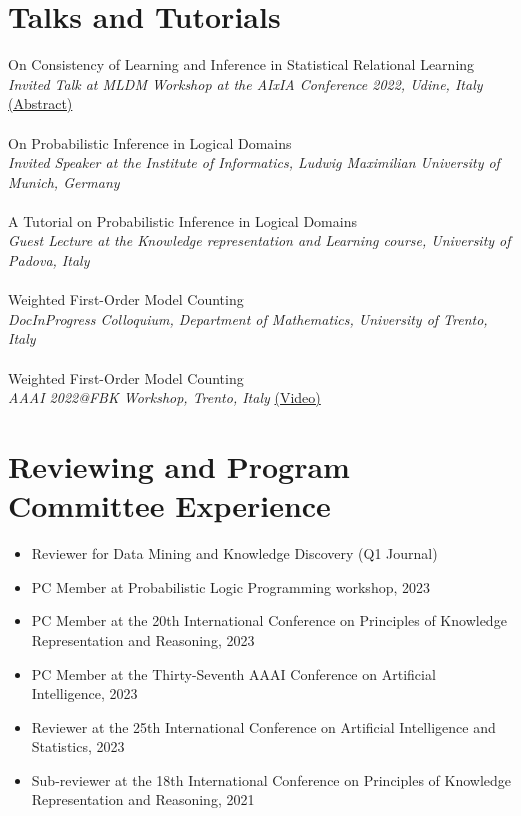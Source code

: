 \documentclass[10pt, a4paper]{article}
\newcommand{\years}[1]{\marginnote{\scriptsize #1}}
\begin{document}
\section*{Talks and Tutorials}
\noindent
\years{2022}On Consistency of Learning and Inference in Statistical Relational Learning \\
\emph{Invited Talk at MLDM Workshop at the AIxIA Conference 2022, Udine, Italy }\href{https://sites.google.com/view/mldm2022/program?authuser=0}{ (Abstract)}\\ \\
\years{2022}On Probabilistic Inference in Logical Domains\\
\emph{Invited Speaker at the Institute of Informatics, Ludwig Maximilian University of Munich, Germany}\\  \\
\years{2022}A Tutorial on Probabilistic Inference in Logical Domains\\ \emph{Guest Lecture at the Knowledge representation and Learning course, University of Padova, Italy}\\ \\
\years{2022}Weighted First-Order Model Counting \\
\emph{DocInProgress Colloquium, Department of Mathematics, University of Trento, Italy} \\ \\ 
\years{2022}Weighted First-Order Model Counting\\
\emph{AAAI 2022@FBK Workshop, Trento, Italy  }\href{https://www.youtube.com/watch?v=2TRXEdq-NZg&t=3937s}{(Video)}



\section*{Reviewing and Program Committee Experience}
\begin{itemize}
    \item Reviewer for  Data Mining and Knowledge Discovery (Q1 Journal)
    \item PC Member at Probabilistic Logic Programming workshop, 2023
    \item PC Member at the  20th International Conference on Principles of Knowledge Representation and Reasoning, 2023 
    \item PC Member at the Thirty-Seventh AAAI Conference on Artificial Intelligence, 2023 
    \item Reviewer at the 25th International Conference on Artificial Intelligence and Statistics, 2023
    \item Sub-reviewer at the 18th International Conference on Principles of Knowledge Representation and Reasoning, 2021  
\end{itemize}
\end{document}
